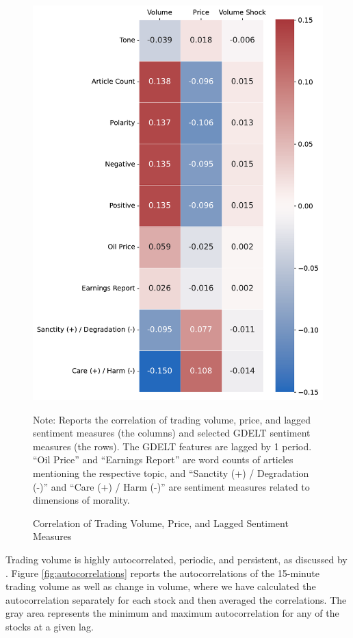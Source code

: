 \documentclass[12pt]{article}
\begin{document}
\begin{figure}[H]
    \centering
    \caption{Correlation of Trading Volume, Price, and Lagged Sentiment Measures}
    \includegraphics[width=0.6\linewidth]{../Output/correlations.pdf}
    \begin{minipage}{0.8\linewidth}
        \footnotesize
        \singlespacing
        Note: Reports the correlation of trading volume, price, and lagged sentiment measures (the columns) and selected GDELT sentiment measures (the rows). The GDELT features are lagged by 1 period. ``Oil Price'' and ``Earnings Report'' are word counts of articles mentioning the respective topic, and ``Sanctity (+) / Degradation (-)'' and ``Care (+) / Harm (-)'' are sentiment measures related to dimensions of morality.
    \end{minipage}
    \label{fig:lagged_volume}
\end{figure}

Trading volume is highly autocorrelated, periodic, and persistent, as discussed by \textcite{brownlees2011intra}. Figure \ref{fig:autocorrelations} reports the autocorrelations of the 15-minute trading volume as well as change in volume, where we have calculated the autocorrelation separately for each stock and then averaged the correlations. The gray area represents the minimum and maximum autocorrelation for any of the stocks at a given lag.
\end{document}
